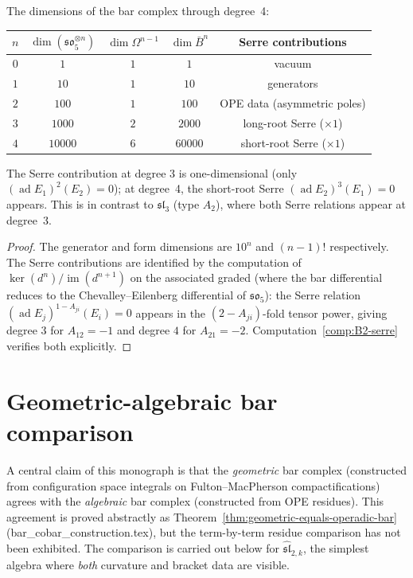 \begin{proposition}
\label{prop:so5-bar-dims}
The dimensions of the bar complex through degree~4:
\begin{center}
\renewcommand{\arraystretch}{1.2}
\begin{tabular}{c|ccc|c}
$n$ & $\dim(\mathfrak{so}_5^{\otimes n})$ &
$\dim \Omega^{n-1}$ & $\dim \bar{B}^n$ & Serre contributions \\
\hline
$0$ & $1$ & $1$ & $1$ & vacuum \\
$1$ & $10$ & $1$ & $10$ & generators \\
$2$ & $100$ & $1$ & $100$ & OPE data (asymmetric poles) \\
$3$ & $1000$ & $2$ & $2000$ & long-root Serre ($\times 1$) \\
$4$ & $10000$ & $6$ & $60000$ & short-root Serre ($\times 1$)
\end{tabular}
\end{center}
The Serre contribution at degree 3 is one-dimensional (only
$(\operatorname{ad} E_1)^2(E_2) = 0$); at degree~4, the short-root
Serre $(\operatorname{ad} E_2)^3(E_1) = 0$ appears. This is in
contrast to $\mathfrak{sl}_3$ (type $A_2$), where both Serre relations
appear at degree~3.
\end{proposition}

\begin{proof}
The generator and form dimensions are $10^n$ and $(n-1)!$ respectively.
The Serre contributions are identified by the computation of
$\ker(d^n)/\operatorname{im}(d^{n+1})$ on the associated graded (where
the bar differential reduces to the Chevalley--Eilenberg differential
of $\mathfrak{so}_5$): the Serre relation
$(\operatorname{ad} E_j)^{1-A_{ji}}(E_i) = 0$ appears in the
$(2 - A_{ji})$-fold tensor power, giving degree $3$ for $A_{12} = -1$
and degree $4$ for $A_{21} = -2$.
Computation~\ref{comp:B2-serre} verifies both explicitly.
\end{proof}


\section{Geometric-algebraic bar comparison}
\label{sec:geometric-algebraic-comparison}

A central claim of this monograph is that the \emph{geometric} bar
complex (constructed from configuration space integrals on
Fulton--MacPherson compactifications) agrees with the \emph{algebraic}
bar complex (constructed from OPE residues). This agreement is
proved abstractly as
Theorem~\ref{thm:geometric-equals-operadic-bar}
(bar\_cobar\_construction.tex), but the term-by-term residue comparison has
not been exhibited. The comparison is carried out below for
$\widehat{\mathfrak{sl}}_{2,k}$, the simplest algebra where \emph{both}
curvature and bracket data are visible.

